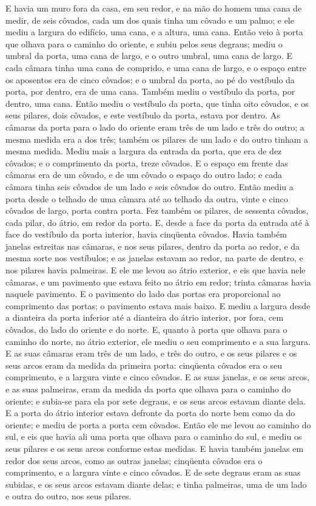 E havia um muro fora da casa, em seu redor, e na mão do homem uma
cana de medir, de seis côvados, cada um dos quais tinha um côvado e
um palmo; e ele mediu a largura do edifício, uma cana, e a altura,
uma cana. Então veio à porta que olhava para o caminho do
oriente, e subiu pelos seus degraus; mediu o umbral da porta, uma
cana de largo, e o outro umbral, uma cana de largo. E cada
câmara tinha uma cana de comprido, e uma cana de largo, e o espaço
entre os aposentos era de cinco côvados; e o umbral da porta, ao pé
do vestíbulo da porta, por dentro, era de uma cana. Também mediu
o vestíbulo da porta, por dentro, uma cana. Então mediu o
vestíbulo da porta, que tinha oito côvados, e os seus pilares, dois
côvados, e este vestíbulo da porta, estava por dentro. As
câmaras da porta para o lado do oriente eram três de um lado e três
do outro; a mesma medida era a dos três; também os pilares de um
lado e do outro tinham a mesma medida. Mediu mais a largura
da entrada da porta, que era de dez côvados; e o comprimento da
porta, treze côvados. E o espaço em frente das câmaras era de
um côvado, e de um côvado o espaço do outro lado; e cada câmara
tinha seis côvados de um lado e seis côvados do outro. Então
mediu a porta desde o telhado de uma câmara até ao telhado da outra,
vinte e cinco côvados de largo, porta contra porta. Fez
também os pilares, de sessenta côvados, cada pilar, do átrio, em
redor da porta. E, desde a face da porta da entrada até à
face do vestíbulo da porta interior, havia cinqüenta côvados.
Havia também janelas estreitas nas câmaras, e nos seus
pilares, dentro da porta ao redor, e da mesma sorte nos vestíbulos;
e as janelas estavam ao redor, na parte de dentro, e nos pilares
havia palmeiras. E ele me levou ao átrio exterior, e eis que
havia nele câmaras, e um pavimento que estava feito no átrio em
redor; trinta câmaras havia naquele pavimento. E o pavimento
do lado das portas era proporcional ao comprimento das portas; o
pavimento estava mais baixo. E mediu a largura desde a
dianteira da porta inferior até a dianteira do átrio interior, por
fora, cem côvados, do lado do oriente e do norte. E, quanto à
porta que olhava para o caminho do norte, no átrio exterior, ele
mediu o seu comprimento e a sua largura. E as suas câmaras
eram três de um lado, e três do outro, e os seus pilares e os seus
arcos eram da medida da primeira porta: cinqüenta côvados era o seu
comprimento, e a largura vinte e cinco côvados. E as suas
janelas, e os seus arcos, e as suas palmeiras, eram da medida da
porta que olhava para o caminho do oriente; e subia-se para ela por
sete degraus, e os seus arcos estavam diante dela. E a porta
do átrio interior estava defronte da porta do norte bem como da do
oriente; e mediu de porta a porta cem côvados. Então ele me
levou ao caminho do sul, e eis que havia ali uma porta que olhava
para o caminho do sul, e mediu os seus pilares e os seus arcos
conforme estas medidas. E havia também janelas em redor dos
seus arcos, como as outras janelas; cinqüenta côvados era o
comprimento, e a largura vinte e cinco côvados. E de sete
degraus eram as suas subidas, e os seus arcos estavam diante delas;
e tinha palmeiras, uma de um lado e outra do outro, nos seus
pilares.


